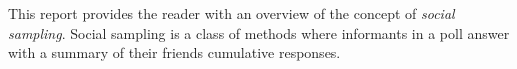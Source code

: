 This report provides the reader with an overview of the concept of \textit{social sampling}.
Social sampling is a class of methods where informants in a poll answer with a summary of their friends cumulative responses.
